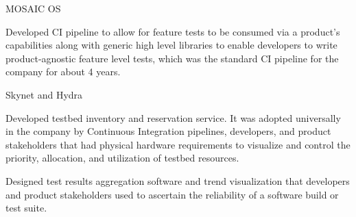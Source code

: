 \begin{cventries}
  \cventry
    {
} {MOSAIC OS} {} {} {
      \begin{cvitems}
        \item {Developed CI pipeline to allow for feature tests to be consumed via a product's capabilities along with generic high level libraries to enable developers to write product-agnostic feature level tests, which was the standard CI pipeline for the company for about 4 years.}
      \end{cvitems}
}

  \cventry
    {
} {Skynet and Hydra} {} {} {
      \begin{cvitems} %
        \item {Developed testbed inventory and reservation service. It was adopted universally in the company by Continuous Integration pipelines, developers, and product stakeholders that had physical hardware requirements to visualize and control the priority, allocation, and utilization of testbed resources.}
        \item {Designed test results aggregation software and trend visualization that developers and product stakeholders used to ascertain the reliability of a software build or test suite.}
      \end{cvitems}
    }

\end{cventries}
